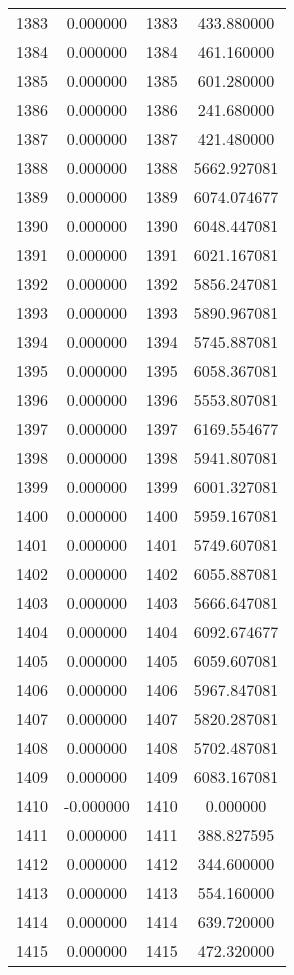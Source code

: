 \documentclass[12pt]{article}
\begin{document}
\begin{longtable}{@{}cccc@{}}
1383 & 0.000000 & 1383 & 433.880000 \\
1384 & 0.000000 & 1384 & 461.160000 \\
1385 & 0.000000 & 1385 & 601.280000 \\
1386 & 0.000000 & 1386 & 241.680000 \\
1387 & 0.000000 & 1387 & 421.480000 \\
1388 & 0.000000 & 1388 & 5662.927081 \\
1389 & 0.000000 & 1389 & 6074.074677 \\
1390 & 0.000000 & 1390 & 6048.447081 \\
1391 & 0.000000 & 1391 & 6021.167081 \\
1392 & 0.000000 & 1392 & 5856.247081 \\
1393 & 0.000000 & 1393 & 5890.967081 \\
1394 & 0.000000 & 1394 & 5745.887081 \\
1395 & 0.000000 & 1395 & 6058.367081 \\
1396 & 0.000000 & 1396 & 5553.807081 \\
1397 & 0.000000 & 1397 & 6169.554677 \\
1398 & 0.000000 & 1398 & 5941.807081 \\
1399 & 0.000000 & 1399 & 6001.327081 \\
1400 & 0.000000 & 1400 & 5959.167081 \\
1401 & 0.000000 & 1401 & 5749.607081 \\
1402 & 0.000000 & 1402 & 6055.887081 \\
1403 & 0.000000 & 1403 & 5666.647081 \\
1404 & 0.000000 & 1404 & 6092.674677 \\
1405 & 0.000000 & 1405 & 6059.607081 \\
1406 & 0.000000 & 1406 & 5967.847081 \\
1407 & 0.000000 & 1407 & 5820.287081 \\
1408 & 0.000000 & 1408 & 5702.487081 \\
1409 & 0.000000 & 1409 & 6083.167081 \\
1410 & -0.000000 & 1410 & 0.000000 \\
1411 & 0.000000 & 1411 & 388.827595 \\
1412 & 0.000000 & 1412 & 344.600000 \\
1413 & 0.000000 & 1413 & 554.160000 \\
1414 & 0.000000 & 1414 & 639.720000 \\
1415 & 0.000000 & 1415 & 472.320000 \\

\end{longtable}
\end{document}
